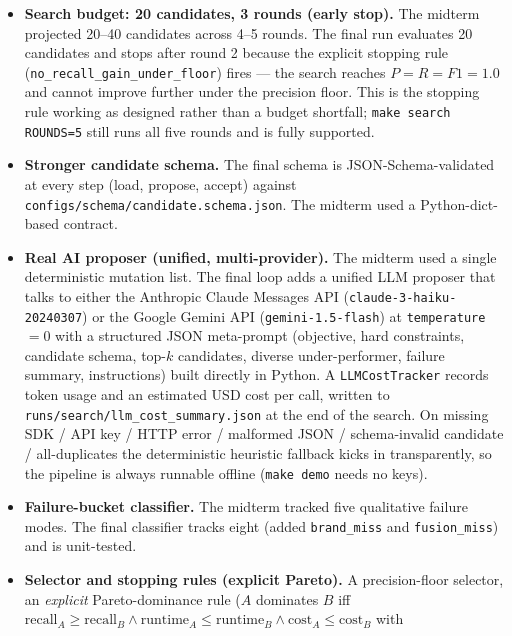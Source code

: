\documentclass[10pt,conference]{IEEEtran}
\begin{document}
\begin{itemize}
    \texttt{replay} plays back cached predictions, and
    \texttt{official\_repo} shells out to the upstream PhishLLM
    repository via a documented stdout JSON contract
    (\texttt{src/phishllm\_search/backends/official.py}).
    \item \textbf{Search budget: 20 candidates, 3 rounds (early stop).}
    The midterm projected 20--40 candidates across 4--5 rounds. The
    final run evaluates 20 candidates and stops after round 2 because
    the explicit stopping rule
    (\texttt{no\_recall\_gain\_under\_floor}) fires --- the search
    reaches $P\!=\!R\!=\!F1\!=\!1.0$ and cannot improve further under the
    precision floor. This is the stopping rule working as designed
    rather than a budget shortfall; \texttt{make search ROUNDS=5} still
    runs all five rounds and is fully supported.
    \item \textbf{Stronger candidate schema.} The final schema is
    JSON-Schema-validated at every step (load, propose, accept) against
    \texttt{configs/schema/candidate.schema.json}. The midterm used a
    Python-dict-based contract.
    \item \textbf{Real AI proposer (unified, multi-provider).} The
    midterm used a single deterministic mutation list. The final loop
    adds a unified LLM proposer that talks to either the Anthropic
    Claude Messages API (\texttt{claude-3-haiku-20240307}) or the Google
    Gemini API (\texttt{gemini-1.5-flash}) at \texttt{temperature}$=\!0$
    with a structured JSON meta-prompt (objective, hard constraints,
    candidate schema, top-$k$ candidates, diverse under-performer,
    failure summary, instructions) built directly in Python. A
    \texttt{LLMCostTracker} records token usage and an estimated USD
    cost per call, written to \texttt{runs/search/llm\_cost\_summary.json}
    at the end of the search. On missing SDK / API key / HTTP error /
    malformed JSON / schema-invalid candidate / all-duplicates the
    deterministic heuristic fallback kicks in transparently, so the
    pipeline is always runnable offline (\texttt{make demo} needs no
    keys).
    \item \textbf{Failure-bucket classifier.} The midterm tracked five
    qualitative failure modes. The final classifier tracks eight (added
    \texttt{brand\_miss} and \texttt{fusion\_miss}) and is unit-tested.
    \item \textbf{Selector and stopping rules (explicit Pareto).} A
    precision-floor selector, an \emph{explicit} Pareto-dominance rule
    ($A$ dominates $B$ iff
    $\text{recall}_A\!\ge\!\text{recall}_B \land \text{runtime}_A\!\le\!\text{runtime}_B \land \text{cost}_A\!\le\!\text{cost}_B$ with

\end{itemize}
\end{document}
